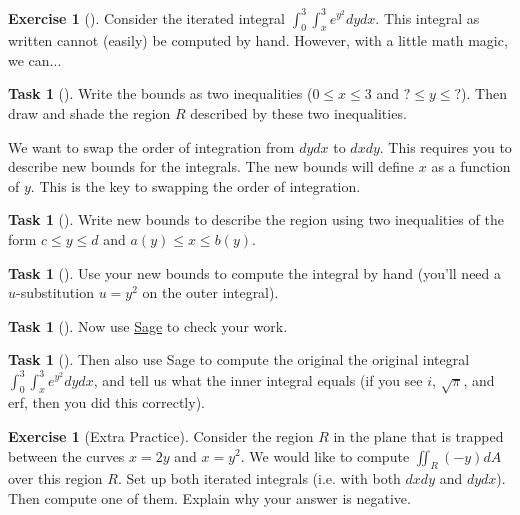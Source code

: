 \documentclass[10pt,]{book}
\theoremstyle{plain}
\theoremstyle{definition}
\theoremstyle{definition}
\theoremstyle{definition}
\theoremstyle{definition}
\newtheorem{exploration}[project]{Exercise}
\newtheorem{task}[project]{Task}
\theoremstyle{definition}
\numberwithin{equation}{section}
\newcommand{\ds}{\displaystyle}
\begin{document}
\begin{exploration}[]\label{exploration-252}
Consider the iterated integral \(\ds \int_0^3\int_x^3 e^{y^2}dydx\). This integral as written cannot (easily) be computed by hand. However, with a little math magic, we can...%
\begin{task}[]\label{task-685}
Write the bounds as two inequalities (\(0\leq x\leq 3\) and \(?\leq y\leq ?\)). Then draw and shade the region \(R\) described by these two inequalities.%
\end{task}
We want to swap the order of integration from \(dydx\) to \(dxdy\). This requires you to describe new bounds for the integrals. The new bounds will define \(x\) as a function of \(y\). This is the key to swapping the order of integration.%
\begin{task}[]\label{task-686}
Write new bounds to describe the region using two inequalities of the form \(c\leq y\leq d\) and \(a(y)\leq x\leq b(y)\).%
\end{task}
\begin{task}[]\label{task-687}
Use your new bounds to compute the integral by hand (you'll need a \(u\)-substitution \(u=y^2\) on the outer integral).%
\end{task}
\begin{task}[]\label{task-688}
Now use \href{http://bmw.byuimath.com/dokuwiki/doku.php?id=double_integral_calculator}{Sage} to check your work.%
\end{task}
\begin{task}[]\label{task-689}
Then also use Sage to compute the original the original integral \(\ds \int_0^3\int_x^3 e^{y^2}dydx\), and tell us what the inner integral equals (if you see \(i\), \(\sqrt{\pi}\), and erf, then you did this correctly).%
\end{task}
\end{exploration}
\begin{exploration}[Extra Practice]\label{exploration-253}
Consider the region \(R\) in the plane that is trapped between the curves \(x=2y\) and \(x=y^2\). We would like to compute \(\iint_R (-y) dA\) over this region \(R\). Set up both iterated integrals (i.e. with both \(dxdy\) and \(dydx\)). Then compute one of them. Explain why your answer is negative.%
\end{exploration}
\typeout{************************************************}
\typeout{************************************************}
\end{document}
